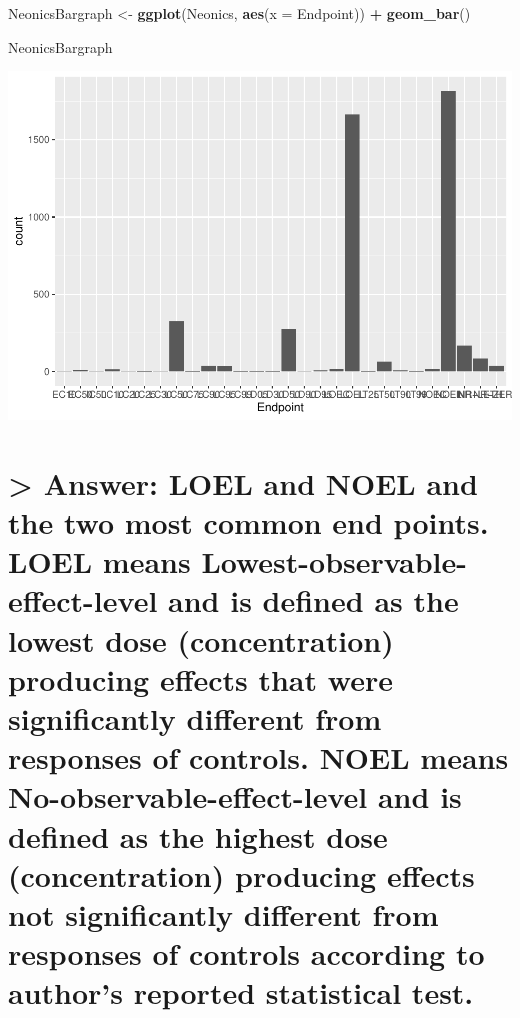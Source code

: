 \documentclass[]{article}
\newenvironment{Shaded}{\begin{snugshade}}{\end{snugshade}}
\newcommand{\KeywordTok}[1]{\textcolor[rgb]{0.13,0.29,0.53}{\textbf{#1}}}
\newcommand{\DataTypeTok}[1]{\textcolor[rgb]{0.13,0.29,0.53}{#1}}
\newcommand{\StringTok}[1]{\textcolor[rgb]{0.31,0.60,0.02}{#1}}
\newcommand{\OperatorTok}[1]{\textcolor[rgb]{0.81,0.36,0.00}{\textbf{#1}}}
\newcommand{\NormalTok}[1]{#1}
\begin{document}
\begin{Shaded}
\begin{Highlighting}[]
\NormalTok{NeonicsBargraph <-}\StringTok{ }\KeywordTok{ggplot}\NormalTok{(Neonics, }\KeywordTok{aes}\NormalTok{(}\DataTypeTok{x =}\NormalTok{ Endpoint)) }\OperatorTok{+}
\StringTok{  }\KeywordTok{geom_bar}\NormalTok{()}

\NormalTok{NeonicsBargraph}
\end{Highlighting}
\end{Shaded}

\includegraphics{A03_DataExploration_files/figure-latex/unnamed-chunk-8-1.pdf}

\section{\textgreater{} Answer: LOEL and NOEL and the two most common
end points. LOEL means Lowest-observable-effect-level and is defined as
the lowest dose (concentration) producing effects that were
significantly different from responses of controls. NOEL means
No-observable-effect-level and is defined as the highest dose
(concentration) producing effects not significantly different from
responses of controls according to author's reported statistical
test.}\label{answer-loel-and-noel-and-the-two-most-common-end-points.-loel-means-lowest-observable-effect-level-and-is-defined-as-the-lowest-dose-concentration-producing-effects-that-were-significantly-different-from-responses-of-controls.-noel-means-no-observable-effect-level-and-is-defined-as-the-highest-dose-concentration-producing-effects-not-significantly-different-from-responses-of-controls-according-to-authors-reported-statistical-test.}
\end{document}
